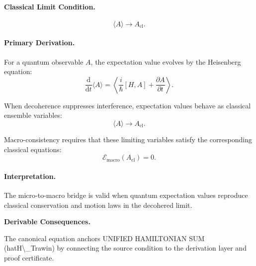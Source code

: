 \paragraph{Classical Limit Condition.}
\begin{equation}
\langle A\rangle
\longrightarrow
A_{\mathrm{cl}} .
\end{equation}

\paragraph{Primary Derivation.}
For a quantum observable $A$, the expectation value evolves by the Heisenberg equation:
\begin{equation}
\frac{\mathrm{d}}{\mathrm{d}t}\langle A\rangle
=
\left\langle
\frac{i}{\hbar}[H,A]
+
\frac{\partial A}{\partial t}
\right\rangle .
\end{equation}

When decoherence suppresses interference, expectation values behave as classical ensemble variables:
\begin{equation}
\langle A\rangle
\rightarrow
A_{\mathrm{cl}}.
\end{equation}

Macro-consistency requires that these limiting variables satisfy the corresponding classical equations:
\begin{equation}
\boxed{
\mathcal{E}_{\mathrm{macro}}(A_{\mathrm{cl}})=0 .
}
\end{equation}

\paragraph{Interpretation.}
The micro-to-macro bridge is valid when quantum expectation values reproduce classical conservation and motion laws in the decohered limit.

\par\vspace{0.35em}
\noindent\textbf{Derivable Consequences.}\quad
\begingroup
\footnotesize
\raggedright
The canonical equation anchors UNIFIED HAMILTONIAN SUM (hatH\textbackslash{}\_Trawin) by connecting the source condition to the derivation layer and proof certificate.
\par\endgroup

